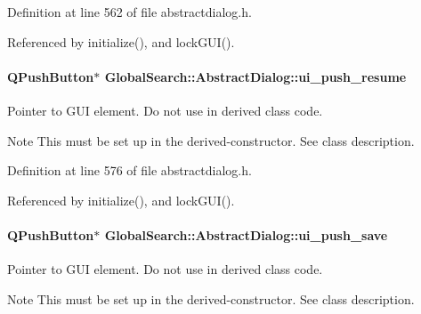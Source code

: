 Definition at line 562 of file abstractdialog.\+h.



Referenced by initialize(), and lock\+G\+U\+I().

\hypertarget{classGlobalSearch_1_1AbstractDialog_a04a1131601c5eab39ef105f385aceca5}{}
\paragraph[{ui\+\_\+push\+\_\+resume}]{\setlength{\rightskip}{0pt plus 5cm}Q\+Push\+Button$\ast$ Global\+Search\+::\+Abstract\+Dialog\+::ui\+\_\+push\+\_\+resume\hspace{0.3cm}{\ttfamily [protected]}}\label{classGlobalSearch_1_1AbstractDialog_a04a1131601c5eab39ef105f385aceca5}
Pointer to G\+U\+I element. Do not use in derived class code. \begin{DoxyNote}{Note}
This must be set up in the derived-\/constructor. See class description. 
\end{DoxyNote}


Definition at line 576 of file abstractdialog.\+h.



Referenced by initialize(), and lock\+G\+U\+I().

\hypertarget{classGlobalSearch_1_1AbstractDialog_a695ed25af57ce8c854e21d3f2c18e250}{}
\paragraph[{ui\+\_\+push\+\_\+save}]{\setlength{\rightskip}{0pt plus 5cm}Q\+Push\+Button$\ast$ Global\+Search\+::\+Abstract\+Dialog\+::ui\+\_\+push\+\_\+save\hspace{0.3cm}{\ttfamily [protected]}}\label{classGlobalSearch_1_1AbstractDialog_a695ed25af57ce8c854e21d3f2c18e250}
Pointer to G\+U\+I element. Do not use in derived class code. \begin{DoxyNote}{Note}
This must be set up in the derived-\/constructor. See class description. 
\end{DoxyNote}


